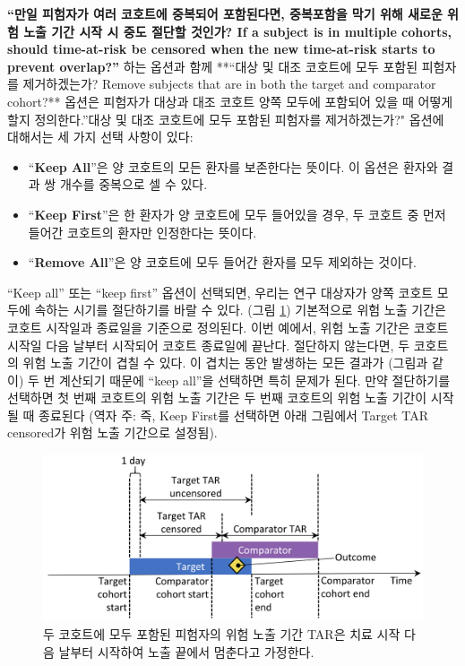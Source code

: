 \documentclass[10.5pt]{book}
\providecommand{\tightlist}{%
  \setlength{\itemsep}{0pt}\setlength{\parskip}{0pt}}
\theoremstyle{definition}
\theoremstyle{definition}
\theoremstyle{definition}
\theoremstyle{remark}
\begin{document}
\textbf{``만일 피험자가 여러 코호트에 중복되어 포함된다면, 중복포함을
막기 위해 새로운 위험 노출 기간 시작 시 중도 절단할 것인가? If a subject
is in multiple cohorts, should time-at-risk be censored when the new
time-at-risk starts to prevent overlap?''} 하는 옵션과 함께 **``대상 및
대조 코호트에 모두 포함된 피험자를 제거하겠는가? Remove subjects that
are in both the target and comparator cohort?** 옵션은 피험자가 대상과
대조 코호트 양쪽 모두에 포함되어 있을 때 어떻게 할지 정의한다.''대상 및
대조 코호트에 모두 포함된 피험자를 제거하겠는가?" 옵션에 대해서는 세
가지 선택 사항이 있다:

\begin{itemize}
\tightlist
\item
  ``\textbf{Keep All}''은 양 코호트의 모든 환자를 보존한다는 뜻이다. 이
  옵션은 환자와 결과 쌍 개수를 중복으로 셀 수 있다.
\item
  ``\textbf{Keep First}''은 한 환자가 양 코호트에 모두 들어있을 경우, 두
  코호트 중 먼저 들어간 코호트의 환자만 인정한다는 뜻이다.
\item
  ``\textbf{Remove All}''은 양 코호트에 모두 들어간 환자를 모두 제외하는
  것이다.
\end{itemize}

``Keep all'' 또는 ``keep first'' 옵션이 선택되면, 우리는 연구 대상자가
양쪽 코호트 모두에 속하는 시기를 절단하기를 바랄 수 있다. (그림
\ref{fig:tar}) 기본적으로 위험 노출 기간은 코호트 시작일과 종료일을
기준으로 정의된다. 이번 예에서, 위험 노출 기간은 코호트 시작일 다음
날부터 시작되어 코호트 종료일에 끝난다. 절단하지 않는다면, 두 코호트의
위험 노출 기간이 겹칠 수 있다. 이 겹치는 동안 발생하는 모든 결과가
(그림과 같이) 두 번 계산되기 때문에 ``keep all''을 선택하면 특히 문제가
된다. 만약 절단하기를 선택하면 첫 번째 코호트의 위험 노출 기간은 두 번째
코호트의 위험 노출 기간이 시작될 때 종료된다 (역자 주: 즉, Keep First를
선택하면 아래 그림에서 Target TAR censored가 위험 노출 기간으로 설정됨).

\begin{figure}

{\centering \includegraphics[width=0.9\linewidth]{images/PopulationLevelEstimation/tar} 

}

\caption{두 코호트에 모두 포함된 피험자의 위험 노출 기간 TAR은 치료 시작 다음 날부터 시작하여 노출 끝에서 멈춘다고 가정한다.}\label{fig:tar}
\end{figure}
\end{document}
